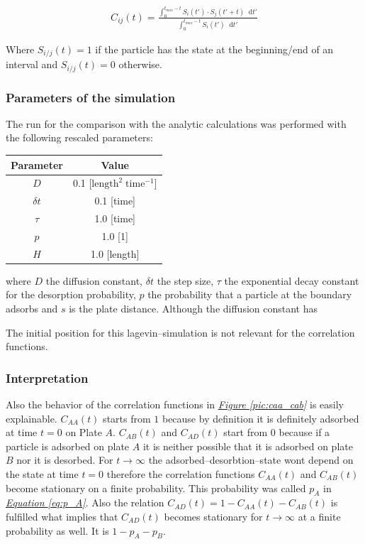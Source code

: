 \documentclass[a4paper, parskip=half]{scrartcl}
\newcommand{\diff}{\mathop{}\!\mathrm{d}}
\newcommand{\myFigRef}[1]{\textit{\hyperref[#1]{Figure \ref*{#1}}}}
\newcommand{\myEqRef}[1]{\textit{\hyperref[eq:#1]{Equation \ref*{eq:#1}}}}
\begin{document}
\begin{align}
  C_{ij}(t) = \frac{\int_0^{t_{max}-t} S_i(t') \cdot S_j(t' + t) \diff t'}{\int_0^{t_{max}-t} S_i(t') \diff t'}
\end{align}

Where $S_{i/j}(t) = 1$ if the particle has the state at the beginning/end of an interval and $S_{i/j}(t) = 0$ otherwise.

\subsubsection{Parameters of the simulation}\label{parameters}
The run for the comparison with the analytic calculations was performed with the following rescaled parameters:
\begin{center}
\begin{tabular}{c|c}
Parameter & Value \\\hline
$D$ & 0.1  [$\mathrm{length}^2\; \mathrm{time}^{-1}$] \\
$\delta t$  & 0.1 [time] \\
$\tau$ & 1.0 [time]\\
$p$ & 1.0 [1]\\
$H$ & 1.0 [length] 
\end{tabular}
\end{center}

where $D$ the diffusion constant, $\delta t$ the step size, $\tau$ the exponential decay constant for the desorption probability, $p$ the probability that a particle at the boundary adsorbs and $s$ is the plate distance. Although the diffusion constant has 

The initial position for this lagevin--simulation is not relevant for the correlation functions. 

\subsubsection{Interpretation}\label{interpretation}

Also the behavior of the correlation functions in \myFigRef{pic:caa_cab} is easily explainable. $C_{AA}(t)$ starts from $1$ because by definition it is definitely adsorbed at time $t=0$ on Plate $A$. $C_{AB}(t)$ and $C_{AD}(t)$ start from $0$ because if a particle is adsorbed on plate $A$ it is neither possible that it is adsorbed on plate $B$ nor it is desorbed. For $t \rightarrow \infty$ the adsorbed--desorbtion--state wont depend on the state at time $t = 0$ therefore the correlation functions $C_{AA}(t)$ and $C_{AB}(t)$ become stationary on a finite probability. This probability was called $p_A$ in \myEqRef{p_A}. Also the relation $C_{AD}(t) = 1 - C_{AA}(t) - C_{AB}(t)$ is fulfilled what implies that $C_{AD}(t)$ becomes stationary for $t \rightarrow \infty$ at a finite probability as well. It is $1 - p_A - p_B$.
\end{document}
